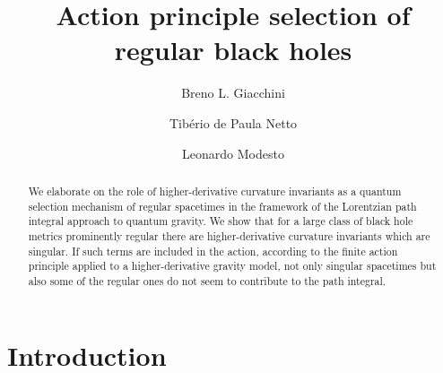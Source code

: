 \documentclass[aps,prd,a4paper,twocolumn,showpacs,showkeys,preprintnumbers,amsmath,amssymb,nofootinbib,usenames,dvipsnames]{revtex4-2}
\begin{document}
\title{Action principle selection of regular black holes
\vspace{0.2cm}}


\author{Breno L. Giacchini}

\author{Tib\'{e}rio de Paula Netto}

\author{Leonardo Modesto}



\begin{abstract} 
\vspace{0.1cm}
\noindent
We elaborate on the role of higher-derivative curvature invariants as a quantum selection mechanism of regular spacetimes 
in the framework of the Lorentzian path integral approach to quantum gravity. 
We show that for a large class of black hole metrics prominently regular there are higher-derivative curvature invariants which are singular. If such terms are included in the action, 
 according to the finite action principle applied to a higher-derivative gravity model, not only singular spacetimes but also some of the regular ones do not seem to contribute to the path integral.
\vspace{1cm}
\end{abstract}


\maketitle
\noindent




\section{Introduction}
\label{Sec1}
\end{document}
